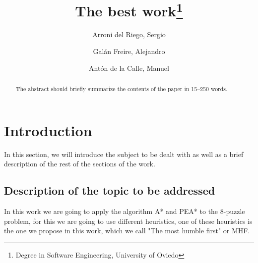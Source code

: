 \documentclass[runningheads]{llncs}
\begin{document}
%
\title{The best work\thanks{Degree in Software Engineering, University of Oviedo}}
%
%
\author{Arroni del Riego, Sergio \and
Galán Freire, Alejandro \and
Antón de la Calle, Manuel }
%
%
%
\maketitle              %
%
\begin{abstract}
The abstract should briefly summarize the contents of the paper in
15--250 words.

\end{abstract}
%
%
%
\section{Introduction}
In this section, we will introduce the subject to be dealt with as well 
as a brief description of the rest of the sections of the work.

\subsection{Description of the topic to be addressed}
In this work we are going to apply the algorithm A* and PEA* to the 8-puzzle problem, 
for this we are going to use different heuristics, 
one of these heuristics is the one we propose in this work, 
which we call "The most humble first" or MHF. 
\end{document}
